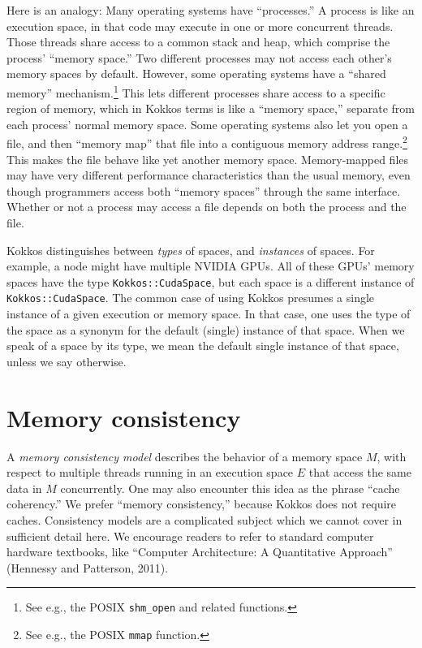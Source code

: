Here is an analogy: Many operating systems have ``processes.''
A process is like an execution space, in that code may execute in one or more concurrent threads.
Those threads share access to a common stack and heap, which comprise the process' ``memory space.''
Two different processes may not access each other's memory spaces by default.
However, some operating systems have a ``shared memory'' mechanism.\footnote{See e.g., the POSIX \lstinline!shm_open! and related functions.}
This lets different processes share access to a specific region of memory,
which in Kokkos terms is like a ``memory space,'' separate from each process' normal memory space.
Some operating systems also let you open a file,
and then ``memory map'' that file into a contiguous memory address range.\footnote{See e.g., the POSIX \lstinline!mmap! function.}
This makes the file behave like yet another memory space.
Memory-mapped files may have very different performance characteristics than the usual memory,
even though programmers access both ``memory spaces'' through the same interface.
Whether or not a process may access a file depends on both the process and the file.

Kokkos distinguishes between \emph{types} of spaces, and \emph{instances} of spaces.
For example, a node might have multiple NVIDIA GPUs.
All of these GPUs' memory spaces have the type \lstinline!Kokkos::CudaSpace!,
but each space is a different instance of \lstinline!Kokkos::CudaSpace!.
The common case of using Kokkos presumes a single instance of a given execution or memory space.
In that case, one uses the type of the space as a synonym for the default (single) instance of that space.
When we speak of a space by its type,
we mean the default single instance of that space,
unless we say otherwise.


\section{Memory consistency}\label{S:Model:Consistency}

A \emph{memory consistency model} describes the behavior of a memory space $M$,
with respect to multiple threads running in an execution space $E$
that access the same data in $M$ concurrently.
One may also encounter this idea as the phrase ``cache coherency.''
We prefer ``memory consistency,'' because Kokkos does not require caches.
Consistency models are a complicated subject which we cannot cover in sufficient detail here.
We encourage readers to refer to standard computer hardware textbooks,
like ``Computer Architecture: A Quantitative Approach'' (Hennessy and Patterson, 2011).

